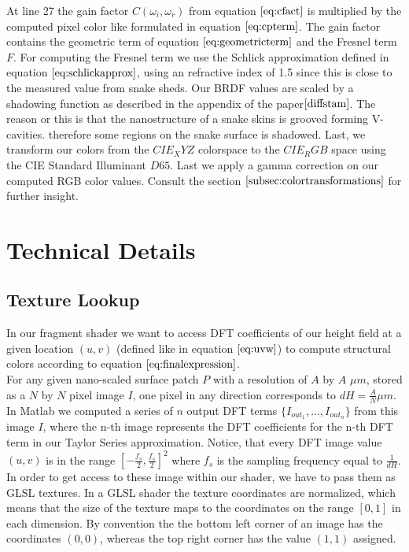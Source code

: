 At line 27 the gain factor $C(\omega_i, \omega_r)$ from equation $\ref{eq:cfact}$ is multiplied by the computed pixel color like formulated in equation $\ref{eq:cpterm}$. The gain factor contains the geometric term of equation $\ref{eq:geometricterm}$ and the Fresnel term $F$. For computing the Fresnel term we use the Schlick approximation defined in equation $\ref{eq:schlickapprox}$, using an refractive index of 1.5 since this is close to the measured value from snake sheds. Our BRDF values are scaled by a shadowing function as described in the appendix of the paper$\cite{diffstam}$. The reason or this is that the nanostructure of a snake skins is grooved forming V-cavities. therefore some regions on the snake surface is shadowed. Last, we transform our colors from the $CIE_XYZ$ colorspace to the $CIE_RGB$ space using the CIE Standard Illuminant $D65$. Last we apply a gamma correction on our computed RGB color values. Consult the section $\ref{subsec:colortransformations}$ for further insight.

\section{Technical Details}
\subsection{Texture Lookup}
\label{sec:texturelookupcoords}
In our fragment shader we want to access DFT coefficients of our height field at a given location $(u,v)$ (defined like in equation $\ref{eq:uvw}$) to compute structural colors according to equation $\ref{eq:finalexpression}$. \\

For any given nano-scaled surface patch $P$ with a resolution of $A$ by $A$ $\mu m$, stored as a $N$ by $N$ pixel image $I$, one pixel in any direction corresponds to $dH = \frac{A}{N} \mu m$. In Matlab we computed a series of $n$ output DFT terms $\{I_{out_1},...,I_{out_n}\}$ from this image $I$, where the n-th image represents the DFT coefficients for the n-th DFT term in our Taylor Series approximation. Notice, that every DFT image value $(u,v)$ is in the range $[-\frac{f_s}{2}, \frac{f_s}{2}]^2$ where $f_s$ is the sampling frequency equal to $\frac{1}{dH}$. \\

In order to get access to these image within our shader, we have to pass them as GLSL textures. In a GLSL shader the texture coordinates are normalized, which means that the size of the texture maps to the coordinates on the range $[0,1]$ in each dimension. By convention the the bottom left corner of an image has the coordinates $(0,0)$, whereas the top right corner has the value $(1,1)$ assigned. \\ 

